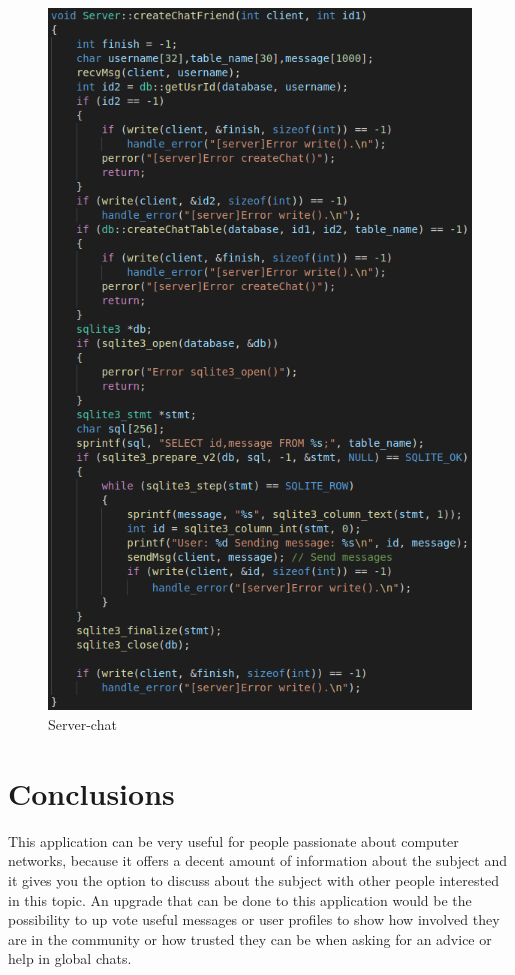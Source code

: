 \documentclass[runningheads]{llncs}
\begin{document}
\begin{figure}[H]
\begin{center}
\includegraphics[]{images/server-chat.png}
\caption{Server-chat}
\end{center}
\end{figure}

\section{Conclusions}

This application can be very useful for people passionate about computer networks, because it offers a decent amount of information about the subject and it gives you the option to discuss about the subject with other people interested in this topic. An upgrade that can be done to this application would be the possibility to up vote useful messages or user profiles to show how involved they are in the community or how trusted they can be when asking for an advice or help in global chats. 


\end{document}
